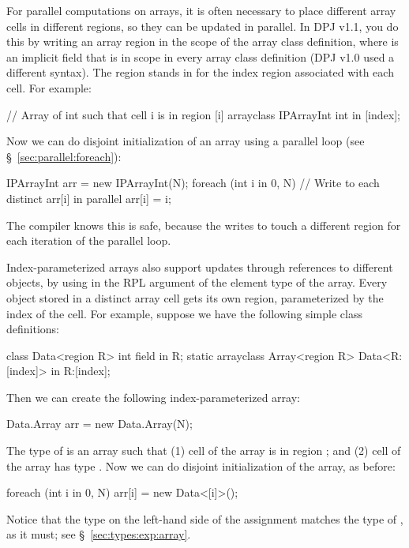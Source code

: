For parallel computations on arrays, it is often necessary to place
different array cells in different regions, so they can be updated in
parallel.  In DPJ v1.1, you do this by writing an array region
\kwd{[index]} in the scope of the array class definition, where
 is an implicit field that is in scope in every array class
definition (DPJ v1.0 used a different syntax).  The region
\kwd{[index]} stands in for the index region associated with each
cell. For example:
%
\begin{dpjlisting}
// Array of int such that cell i is in region [i]
arrayclass IPArrayInt {
  int in [index];
}
\end{dpjlisting}
%
Now we can do disjoint initialization of an array using a parallel
 loop (see \S~\ref{sec:parallel:foreach}):
%
\begin{dpjlisting}
IPArrayInt arr = new IPArrayInt(N);
foreach (int i in 0, N) {
  // Write to each distinct arr[i] in parallel
  arr[i] = i;
}
\end{dpjlisting}
%
The compiler knows this is safe, because the writes to 
touch a different region for each iteration of the parallel loop.

Index-parameterized arrays also support updates through references to
different objects, by using \kwd{[index]} in the RPL argument of the
element type of the array.  Every object stored in a distinct array
cell gets its own region, parameterized by the index of the cell.  For
example, suppose we have the following simple class definitions:
%
\begin{dpjlisting}
class Data<region R> {
  int field in R;
  static arrayclass Array<region R> {
    Data<R:[index]> in R:[index];
  }
}
\end{dpjlisting}
%
Then we can create the following index-parameterized array:
%
\begin{dpjlisting}
Data.Array arr = new Data.Array(N);
\end{dpjlisting}
%
The type of  is an array such that (1) cell  of the
array is in region \kwd{[i]}; and (2) cell  of the array has
type .  Now we can do disjoint initialization of the
array, as before:
%
\begin{dpjlisting}
foreach (int i in 0, N)
  arr[i] = new Data<[i]>();
\end{dpjlisting}
%
Notice that the type  on the left-hand side of the
assignment matches the type of , as it must; see
\S~\ref{sec:types:exp:array}.

